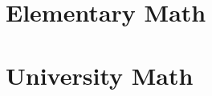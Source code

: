 \documentclass{tufte-book}
\begin{document}
\mainmatter

\part{Elementary Math}

\part{University Math}




\end{document}
